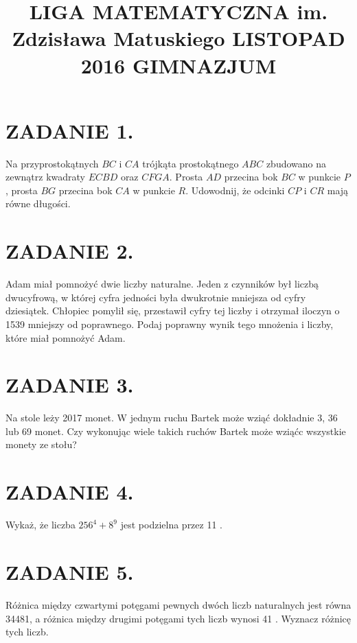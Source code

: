 \documentclass[10pt]{article}
\title{LIGA MATEMATYCZNA im. Zdzisława Matuskiego LISTOPAD 2016 GIMNAZJUM }
\author{}
\date{}
\begin{document}
\maketitle
\section*{ZADANIE 1.}
Na przyprostokątnych \(B C\) i \(C A\) trójkąta prostokątnego \(A B C\) zbudowano na zewnątrz kwadraty \(E C B D\) oraz \(C F G A\). Prosta \(A D\) przecina bok \(B C\) w punkcie \(P\), prosta \(B G\) przecina bok \(C A\) w punkcie \(R\). Udowodnij, że odcinki \(C P\) i \(C R\) mają równe długości.

\section*{ZADANIE 2.}
Adam miał pomnożyć dwie liczby naturalne. Jeden z czynników był liczbą dwucyfrową, w której cyfra jedności była dwukrotnie mniejsza od cyfry dziesiątek. Chłopiec pomylił się, przestawił cyfry tej liczby i otrzymał iloczyn o 1539 mniejszy od poprawnego. Podaj poprawny wynik tego mnożenia i liczby, które miał pomnożyć Adam.

\section*{ZADANIE 3.}
Na stole leży 2017 monet. W jednym ruchu Bartek może wziąć dokładnie 3, 36 lub 69 monet. Czy wykonując wiele takich ruchów Bartek może wziąćc wszystkie monety ze stołu?

\section*{ZADANIE 4.}
Wykaż, że liczba \(256^{4}+8^{9}\) jest podzielna przez 11 .

\section*{ZADANIE 5.}
Różnica między czwartymi potęgami pewnych dwóch liczb naturalnych jest równa 34481, a różnica między drugimi potęgami tych liczb wynosi 41 . Wyznacz różnicę tych liczb.
\end{document}
